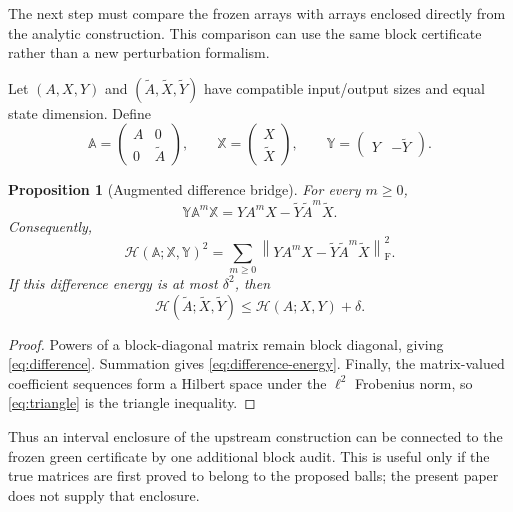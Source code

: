 \documentclass[11pt]{article}
\newtheorem{proposition}[theorem]{Proposition}
\theoremstyle{definition}
\newcommand{\norm}[1]{\left\lVert#1\right\rVert}
\newcommand{\F}{\mathrm F}
\newcommand{\HH}{\mathcal H}
\begin{document}
The next step must compare the frozen arrays with arrays enclosed directly
from the analytic construction.  This comparison can use the same block
certificate rather than a new perturbation formalism.

Let $(A,X,Y)$ and $(\widetilde A,\widetilde X,\widetilde Y)$ have compatible
input/output sizes and equal state dimension.  Define
\begin{equation}
 \mathbb A=\begin{pmatrix}A&0\\0&\widetilde A\end{pmatrix},
 \qquad
 \mathbb X=\begin{pmatrix}X\\\widetilde X\end{pmatrix},
 \qquad
 \mathbb Y=\begin{pmatrix}Y&-\widetilde Y\end{pmatrix}.
 \label{eq:augmented}
\end{equation}

\begin{proposition}[Augmented difference bridge]
\label{prop:bridge}
For every $m\ge0$,
\begin{equation}
 \mathbb Y\mathbb A^m\mathbb X
 =YA^mX-\widetilde Y\widetilde A^m\widetilde X.
 \label{eq:difference}
\end{equation}
Consequently,
\begin{equation}
 \HH(\mathbb A;\mathbb X,\mathbb Y)^2
 =\sum_{m\ge0}
 \norm{YA^mX-\widetilde Y\widetilde A^m\widetilde X}_{\F}^2.
 \label{eq:difference-energy}
\end{equation}
If this difference energy is at most $\delta^2$, then
\begin{equation}
 \HH(\widetilde A;\widetilde X,\widetilde Y)
 \le \HH(A;X,Y)+\delta.
 \label{eq:triangle}
\end{equation}
\end{proposition}

\begin{proof}
Powers of a block-diagonal matrix remain block diagonal, giving
\eqref{eq:difference}.  Summation gives \eqref{eq:difference-energy}.
Finally, the matrix-valued coefficient sequences form a Hilbert space under
the $\ell^2$ Frobenius norm, so \eqref{eq:triangle} is the triangle
inequality.
\end{proof}

Thus an interval enclosure of the upstream construction can be connected to
the frozen green certificate by one additional block audit.  This is useful
only if the true matrices are first proved to belong to the proposed balls;
the present paper does not supply that enclosure.
\end{document}

